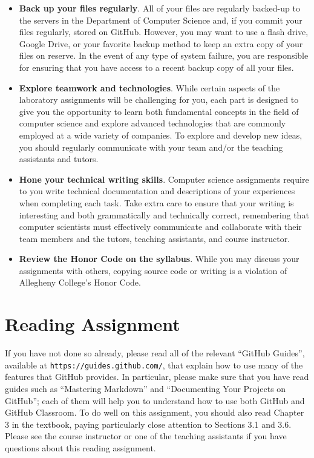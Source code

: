 \documentclass[11pt]{article}
\newcommand{\url}[1]{\lstinline{#1}}
\begin{document}
\begin{itemize}
\item {\bf Back up your files regularly}. All of your files are regularly backed-up to the servers in the Department of
  Computer Science and, if you commit your files regularly, stored on GitHub. However, you may want to use a flash
  drive, Google Drive, or your favorite backup method to keep an extra copy of your files on reserve. In the event of
  any type of system failure, you are responsible for ensuring that you have access to a recent backup copy of all your
  files.

\item {\bf Explore teamwork and technologies}. While certain aspects of the laboratory assignments will be challenging
  for you, each part is designed to give you the opportunity to learn both fundamental concepts in the field of computer
  science and explore advanced technologies that are commonly employed at a wide variety of companies. To explore and
  develop new ideas, you should regularly communicate with your team and/or the teaching assistants and tutors.

\item {\bf Hone your technical writing skills}. Computer science assignments require to you write technical
  documentation and descriptions of your experiences when completing each task. Take extra care to ensure that your
  writing is interesting and both grammatically and technically correct, remembering that computer scientists must
  effectively communicate and collaborate with their team members and the tutors, teaching assistants, and course
  instructor.

\item {\bf Review the Honor Code on the syllabus}. While you may discuss your assignments with others, copying source
  code or writing is a violation of Allegheny College's Honor Code.

\end{itemize}

\section*{Reading Assignment}

If you have not done so already, please read all of the relevant ``GitHub
Guides'', available at \url{https://guides.github.com/}, that explain how to
use many of the features that GitHub provides. In particular, please make sure
that you have read guides such as ``Mastering Markdown'' and ``Documenting Your
Projects on GitHub''; each of them will help you to understand how to use both
GitHub and GitHub Classroom. To do well on this assignment, you should also
read Chapter 3 in the textbook, paying particularly close attention to Sections
3.1 and 3.6. Please see the course instructor or one of the teaching assistants
if you have questions about this reading assignment.
\end{document}
